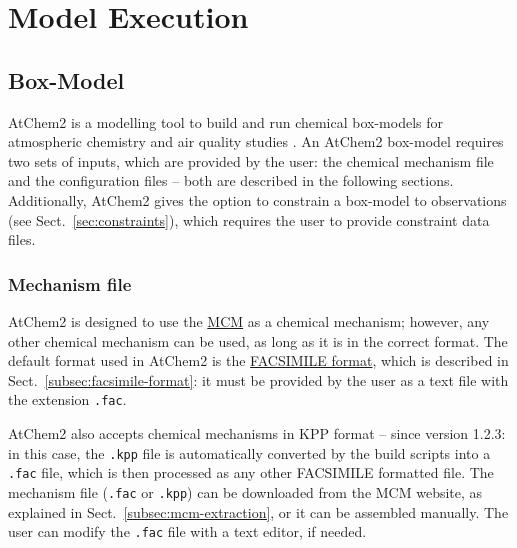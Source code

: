 %
%
%
%

\chapter{Model Execution} \label{ch:execution}

\section{Box-Model} \label{sec:box-model}

AtChem2 is a modelling tool to build and run chemical box-models for
atmospheric chemistry and air quality studies \citep{sommariva_2020}.
An AtChem2 box-model requires two sets of inputs, which are provided
by the user: the chemical mechanism file and the configuration files
-- both are described in the following sections. Additionally, AtChem2
gives the option to constrain a box-model to observations (see
Sect.~\ref{sec:constraints}), which requires the user to provide
constraint data files.

\subsection{Mechanism file} \label{subsec:mechanism-file}

AtChem2 is designed to use the \href{https://mcm.york.ac.uk/MCM}{MCM}
as a chemical mechanism; however, any other chemical mechanism can be
used, as long as it is in the correct format. The default format used
in AtChem2 is the \hyperref[subsec:facsimile-format]{FACSIMILE format},
which is described in Sect.~\ref{subsec:facsimile-format}: it must be
provided by the user as a text file with the extension \texttt{.fac}.

AtChem2 also accepts chemical mechanisms in KPP format -- since
version 1.2.3: in this case, the \texttt{.kpp} file is automatically
converted by the build scripts into a \texttt{.fac} file, which is
then processed as any other FACSIMILE formatted file. The mechanism
file (\texttt{.fac} or \texttt{.kpp}) can be downloaded from the MCM
website, as explained in Sect.~\ref{subsec:mcm-extraction}, or it can
be assembled manually. The user can modify the \texttt{.fac} file with
a text editor, if needed.


